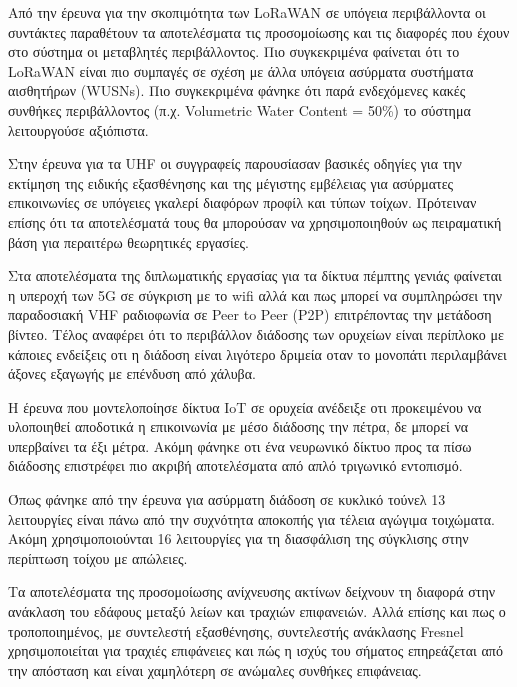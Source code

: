     Από την έρευνα για την σκοπιμότητα των LoRaWAN σε υπόγεια περιβάλλοντα 
    \cite{zhao_feasibility_2023} οι συντάκτες παραθέτουν τα αποτελέσματα τις προσομοίωσης
    και τις διαφορές που έχουν στο σύστημα οι μεταβλητές περιβάλλοντος. Πιο συγκεκριμένα
    φαίνεται ότι το LoRaWAN είναι πιο συμπαγές σε σχέση με άλλα υπόγεια ασύρματα συστήματα
    αισθητήρων (WUSNs). Πιο συγκεκριμένα φάνηκε ότι παρά ενδεχόμενες κακές συνθήκες 
    περιβάλλοντος (π.χ. Volumetric Water Content = 50\%) το σύστημα λειτουργούσε αξιόπιστα.

    Στην έρευνα για τα UHF \cite{rak_uhf_2007} οι συγγραφείς παρουσίασαν βασικές οδηγίες
    για την εκτίμηση της ειδικής εξασθένησης και της μέγιστης εμβέλειας για ασύρματες
    επικοινωνίες σε υπόγειες γκαλερί διαφόρων προφίλ και τύπων τοίχων. Πρότειναν επίσης 
    ότι τα αποτελέσματά τους θα μπορούσαν να χρησιμοποιηθούν ως πειραματική βάση για 
    περαιτέρω θεωρητικές εργασίες.

    Στα αποτελέσματα της διπλωματικής εργασίας για τα δίκτυα πέμπτης γενιάς \cite{branch_fifth_2021}
    φαίνεται η υπεροχή των 5G σε σύγκριση με το wifi αλλά και πως μπορεί να συμπληρώσει
    την παραδοσιακή VHF ραδιοφωνία σε Peer to Peer (P2P) επιτρέποντας την μετάδοση βίντεο.
    Τέλος αναφέρει ότι το περιβάλλον διάδοσης των ορυχείων είναι περίπλοκο με κάποιες ενδείξεις
    οτι η διάδοση είναι λιγότερο δριμεία οταν το μονοπάτι περιλαμβάνει άξονες εξαγωγής με
    επένδυση από χάλυβα.

    Η έρευνα που μοντελοποίησε δίκτυα IoT σε ορυχεία \cite{ming_study_2019} ανέδειξε οτι 
    προκειμένου να υλοποιηθεί αποδοτικά η επικοινωνία με μέσο διάδοσης την πέτρα, δε μπορεί
    να υπερβαίνει τα έξι μέτρα. Ακόμη φάνηκε οτι ένα νευρωνικό δίκτυο προς τα πίσω διάδοσης
    επιστρέφει πιο ακριβή αποτελέσματα από απλό τριγωνικό εντοπισμό.

    Όπως φάνηκε από την έρευνα για ασύρματη διάδοση σε κυκλικό τούνελ \cite{dudley_wireless_2005}
    13 λειτουργίες είναι πάνω από την συχνότητα αποκοπής για τέλεια αγώγιμα τοιχώματα. Ακόμη
    χρησιμοποιούνται 16 λειτουργίες για τη διασφάλιση της σύγκλισης στην περίπτωση τοίχου 
    με απώλειες.

    Τα αποτελέσματα της προσομοίωσης ανίχνευσης ακτίνων \cite{soo_investigation_2018} δείχνουν
    τη διαφορά στην ανάκλαση του εδάφους μεταξύ λείων και τραχιών επιφανειών. Αλλά επίσης και
    πως ο τροποποιημένος, με συντελεστή εξασθένησης, συντελεστής ανάκλασης Fresnel χρησιμοποιείται
    για τραχιές επιφάνειες και πώς η ισχύς του σήματος επηρεάζεται από την απόσταση και είναι 
    χαμηλότερη σε ανώμαλες συνθήκες επιφάνειας.

